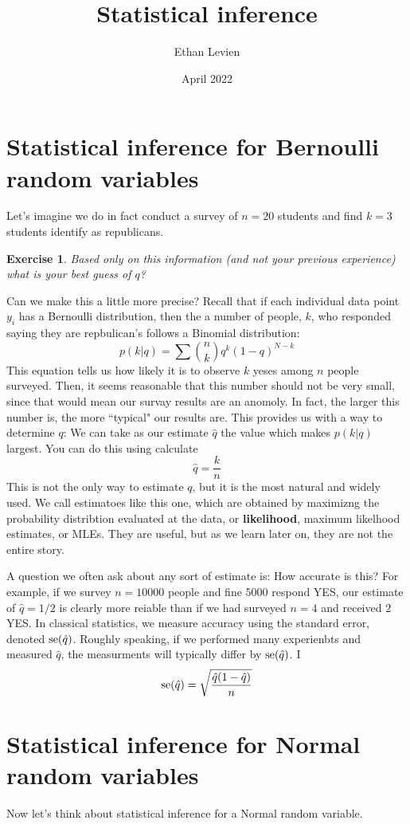 \documentclass{amsart}
\title{Statistical inference}
\author{Ethan Levien}
\date{April 2022}
\newtheorem{exercise}{Exercise}
\begin{document}
\maketitle

\tableofcontents





\section{Statistical inference for Bernoulli random variables}
Let's imagine we do in fact conduct a survey of $n = 20$ students and find $k = 3$ students identify as republicans.
\begin{exercise}
Based only on this information (and not your previous experience) what is your best guess of $q$?
\end{exercise}
Can we make this a little more precise? Recall that if each individual data point$y_i$ has a Bernoulli distribution, then the  a number of people, $k$, who responded saying they are repbulican's follows a Binomial distribution: 
\begin{equation}
p(k|q) = \sum { n \choose k} q^{k} (1-q)^{N-k}
\end{equation}
This equation tells us how likely it is to observe $k$ yeses among $n$ people surveyed. Then, it seems reasonable that this number should not be very small, since that would mean our survay results are an anomoly. In fact, the larger this number is, the more ``typical" our results are. This provides us with a way to determine $q$: We can take as our estimate $\hat{q}$ the value which makes $p(k|q)$ largest. You can do this using calculate 
\begin{equation}
\hat{q} = \frac{k}{n}
\end{equation}
This is not the only way to estimate $q$, but it is the most natural and widely used. We call estimatoes like this one, which are obtained by maximizng the probability distribtion evaluated at the data, or {\bf likelihood}, maximum likelhood estimates, or MLEs. They are useful, but as we learn later on, they are not the entire story.


A question we often ask about any sort of estimate is: How accurate is this? For example, if we survey $n=10000$ people and fine $5000$ respond YES, our estimate of $\hat{q} = 1/2$ is clearly more reiable than if we had surveyed $n=4$ and received $2$ YES. In classical statistics, we measure accuracy using the standard error, denoted ${\rm se}(\hat{q})$.  Roughly speaking, if we performed many experienbts and measured $\hat{q}$, the measurments will typically differ by ${\rm se}(\hat{q})$. I 
\begin{equation}
{\rm se}(\hat{q}) = \sqrt{\frac{\hat{q}(1-\hat{q})}{n}}
\end{equation}







\section{Statistical inference for Normal random variables}
Now let's think about statistical inference for a Normal random variable. 
\end{document}
